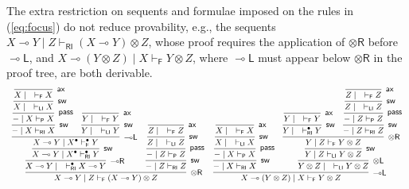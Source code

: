 \documentclass[copyright,creativecommons]{eptcs}
\theoremstyle{definition}
\newcommand{\tl}{\otimes \mathsf{L}}
\newcommand{\tr}{\otimes \mathsf{R}}
\newcommand{\lright}{{\multimap}\mathsf{R}}
\newcommand{\lleft}{{\multimap}\mathsf{L}}
\newcommand{\pass}{\mathsf{pass}}
\newcommand{\ax}{\mathsf{ax}}
\newcommand{\ot}{\otimes}
\newcommand{\lolli}{\multimap}
\newcommand{\RI}{\mathsf{RI}}
\newcommand{\LI}{\mathsf{LI}}
\newcommand{\Pass}{\mathsf{P}}
\newcommand{\F}{\mathsf{F}}
\begin{document}
 The extra restriction on sequents and formulae imposed on the rules in (\ref{eq:focus}) do not reduce provability, e.g., the sequents $X \lolli Y \mid Z \vdash_{\RI} (X \lolli Y) \ot Z$, whose proof requires the application of $\tr$ before $\lleft$, and $X \lolli (Y \ot Z) \mid X \vdash_\F Y \ot Z$, where $\lleft$ must appear below $\tr$ in the proof tree, are both derivable.
 \begin{displaymath}
 \small
   \begin{array}{cc}
     \infer[\tr]{X \lolli Y \mid Z \vdash_{\F} (X \lolli Y) \ot Z}{
      \infer[\lright]{X \lolli Y \mid \quad \vdash^{\bullet}_{\RI} X \lolli Y}{
        \infer[\mathsf{sw}]{X \lolli Y \mid X^{\bullet} \vdash^{\bullet}_{\RI} Y}{
          \infer[\lleft]{X \lolli Y \mid X^{\bullet} \vdash^{\bullet}_{\F} Y}{
            \infer[\mathsf{sw}]{{-} \mid X \vdash_{\RI} X}{
              \infer[\pass]{{-} \mid X \vdash_{\Pass} X}{
                \infer[\mathsf{sw}]{X \mid \quad \vdash_{\LI} X}{
                  \infer[\ax]{X \mid \quad \vdash_{\F} X}{}
                }
              }
            }
            &
            \infer[\mathsf{sw}]{Y \mid \quad \vdash_{\LI} Y}{
              \infer[\ax]{Y \mid \quad \vdash_{\F} Y}{}
            }
          }
        }
      }
      &
      \infer[\mathsf{sw}]{{-} \mid Z \vdash_{\RI} Z}{
        \infer[\pass]{{-} \mid Z \vdash_{\Pass} Z}{
          \infer[\mathsf{sw}]{Z \mid \quad \vdash_{\LI} Z}{
            \infer[\ax]{Z \mid \quad \vdash_{\F} Z}{}
          }
        }
      }
     }
     &
     \infer[\lleft]{X \lolli (Y \ot Z) \mid X \vdash_{\F} Y \ot Z}{
      \infer[\mathsf{sw}]{{-} \mid X \vdash_{\RI} X}{
        \infer[\pass]{{-} \mid X \vdash_{\Pass} X}{
          \infer[\mathsf{sw}]{X \mid \quad \vdash_{\LI} X}{
            \infer[\ax]{X \mid \quad \vdash_{\F} X}{}
          }
        }
      }
      &
      \infer[\tl]{Y \ot Z \mid \quad \vdash_{\LI} Y \ot Z}{
        \infer[\mathsf{sw}]{Y \mid Z \vdash_{\LI} Y \ot Z}{
          \infer[\tr]{Y \mid Z \vdash_{\F} Y \ot Z}{
            \infer[\mathsf{sw}]{Y \mid \quad \vdash_{\RI}^{\bullet} Y}{
              \infer[\ax]{Y \mid \quad \vdash_{\F} Y}{}
            }
            &
            \infer[\mathsf{sw}]{{-} \mid Z \vdash_{\RI} Z}{
              \infer[\pass]{{-} \mid Z \vdash_{\Pass} Z}{
                \infer[\mathsf{sw}]{Z \mid \quad \vdash_{\LI} Z}{
                  \infer[\ax]{Z \mid \quad \vdash_{\F} Z}{}
                }
              }
            }
          }
        }
      }
     }
   \end{array}
   \normalsize
 \end{displaymath}
\end{document}
